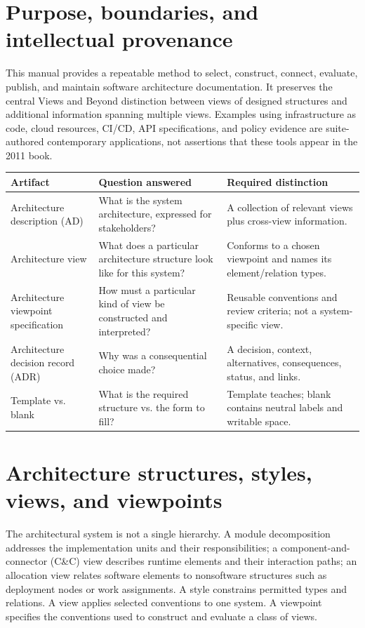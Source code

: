 \documentclass[10pt,letterpaper]{article}
\begin{document}
\DocProvenance
\section{Purpose, boundaries, and intellectual provenance}
This manual provides a repeatable method to select, construct, connect, evaluate, publish, and maintain software architecture documentation. It preserves the central Views and Beyond distinction between views of designed structures and additional information spanning multiple views. Examples using infrastructure as code, cloud resources, CI/CD, API specifications, and policy evidence are suite-authored contemporary applications, not assertions that these tools appear in the 2011 book.

\small
\begin{tabularx}{\linewidth}{@{}YYY@{}}
\toprule
\textbf{Artifact} & \textbf{Question answered} & \textbf{Required distinction} \\
\midrule
Architecture description (AD) & What is the system architecture, expressed for stakeholders? & A collection of relevant views plus cross-view information. \\
Architecture view & What does a particular architecture structure look like for this system? & Conforms to a chosen viewpoint and names its element/relation types. \\
Architecture viewpoint specification & How must a particular kind of view be constructed and interpreted? & Reusable conventions and review criteria; not a system-specific view. \\
Architecture decision record (ADR) & Why was a consequential choice made? & A decision, context, alternatives, consequences, status, and links. \\
Template vs. blank & What is the required structure vs. the form to fill? & Template teaches; blank contains neutral labels and writable space. \\
\bottomrule
\end{tabularx}
\normalsize
\section{Architecture structures, styles, views, and viewpoints}
The architectural system is not a single hierarchy. A module decomposition addresses the implementation units and their responsibilities; a component-and-connector (C\&C) view describes runtime elements and their interaction paths; an allocation view relates software elements to nonsoftware structures such as deployment nodes or work assignments. A style constrains permitted types and relations. A view applies selected conventions to one system. A viewpoint specifies the conventions used to construct and evaluate a class of views.
\end{document}
